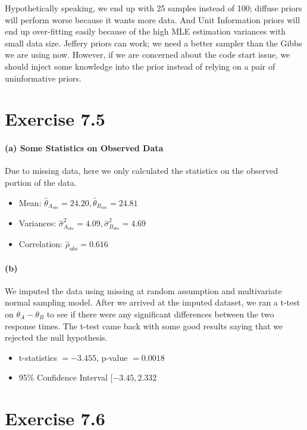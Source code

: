 \documentclass[11pt, letterpaper]{article}
\begin{document}
Hypothetically speaking, we end up with 25 samples instead of 100; diffuse priors will perform worse because it wants more data. And Unit Information priors will end up over-fitting easily because of the high MLE estimation variances with small data size. Jeffery priors can work; we need a better sampler than the Gibbs we are using now. However, if we are concerned about the code start issue, we should inject some knowledge into the prior instead of relying on a pair of uninformative priors.


\section{Exercise 7.5}
\paragraph{(a) Some Statistics on Observed Data}
Due to missing data, here we only calculated the statistics on the observed portion of the data.
\begin{itemize}
    \item Mean: $\hat{\theta}_{A_{obs}} = 24.20, \hat{\theta}_{B_{obs}} = 24.81$
    \item Variances: $\hat{\sigma}^2_{A_{obs}} = 4.09, \hat{\sigma}^2_{B_{obs}} = 4.69$
    \item Correlation: $\hat{\rho}_{obs} = 0.616$
\end{itemize}

\paragraph{(b)}
We imputed the data using missing at random assumption and multivariate normal sampling model. After we arrived at the imputed dataset, we ran a t-test on $\theta_A - \theta_B$ to see if there were any significant differences between the two response times. The t-test came back with some good results saying that we rejected the null hypothesis.
\begin{itemize}
    \item t-statistics $= -3.455$, p-value $= 0.0018$
    \item 95\% Confidence Interval $[-3.45, 2.332$
\end{itemize}

\section{Exercise 7.6}
\end{document}
